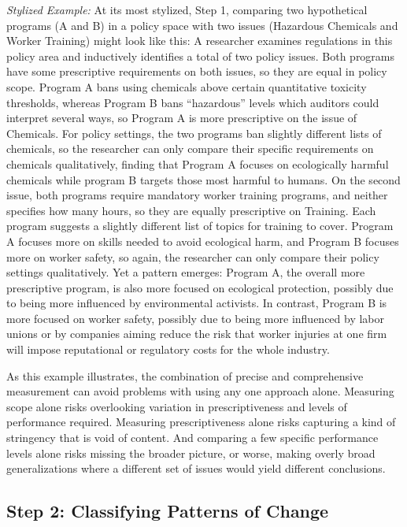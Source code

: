\documentclass[
      12pt,
            Review ]{article}
\begin{document}
\emph{Stylized Example:} At its most stylized, Step 1, comparing two hypothetical programs (A and B) in a policy space with two issues (Hazardous Chemicals and Worker Training) might look like this: A researcher examines regulations in this policy area and inductively identifies a total of two policy issues. Both programs have some prescriptive requirements on both issues, so they are equal in policy scope. Program A bans using chemicals above certain quantitative toxicity thresholds, whereas Program B bans ``hazardous'' levels which auditors could interpret several ways, so Program A is more prescriptive on the issue of Chemicals. For policy settings, the two programs ban slightly different lists of chemicals, so the researcher can only compare their specific requirements on chemicals qualitatively, finding that Program A focuses on ecologically harmful chemicals while program B targets those most harmful to humans. On the second issue, both programs require mandatory worker training programs, and neither specifies how many hours, so they are equally prescriptive on Training. Each program suggests a slightly different list of topics for training to cover. Program A focuses more on skills needed to avoid ecological harm, and Program B focuses more on worker safety, so again, the researcher can only compare their policy settings qualitatively. Yet a pattern emerges: Program A, the overall more prescriptive program, is also more focused on ecological protection, possibly due to being more influenced by environmental activists. In contrast, Program B is more focused on worker safety, possibly due to being more influenced by labor unions or by companies aiming reduce the risk that worker injuries at one firm will impose reputational or regulatory costs for the whole industry.

As this example illustrates, the combination of precise and comprehensive measurement can avoid problems with using any one approach alone. Measuring scope alone risks overlooking variation in prescriptiveness and levels of performance required. Measuring prescriptiveness alone risks capturing a kind of stringency that is void of content. And comparing a few specific performance levels alone risks missing the broader picture, or worse, making overly broad generalizations where a different set of issues would yield different conclusions.

\hypertarget{step-2-classifying-patterns-of-change}{%
\subsection{Step 2: Classifying Patterns of Change}\label{step-2-classifying-patterns-of-change}}
\end{document}
